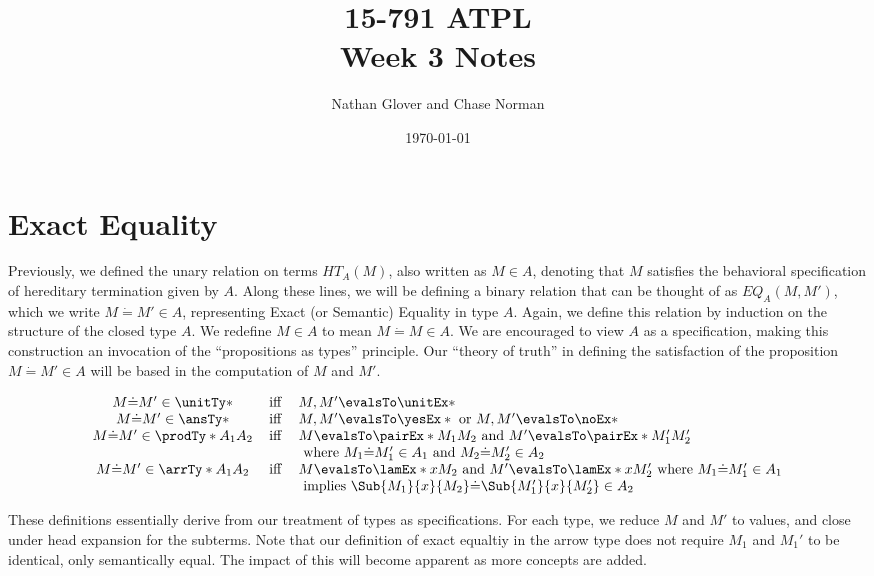 \documentclass[letterpaper]{article}
\title{15-791 ATPL \\ Week 3 Notes}
\author{Nathan Glover and Chase Norman}
\date{\today}
\begin{document}
\maketitle

\section{Exact Equality}

Previously, we defined the unary relation on terms $HT_A(M)$, also written as $M \in A$, denoting that $M$ satisfies the behavioral specification of hereditary termination given by $A$.
Along these lines, we will be defining a binary relation that can be thought of as $EQ_A(M, M')$, which we write $M \dot{=} M' \in A$, representing Exact (or Semantic) Equality in type $A$.
Again, we define this relation by induction on the structure of the closed type $A$. We redefine $M \in A$ to mean $M \dot{=} M \in A$. 
We are encouraged to view $A$ as a specification, making this construction an invocation of the ``propositions as types'' principle. 
Our ``theory of truth'' in defining the satisfaction of the proposition $M \dot{=} M' \in A$ will be based in the computation of $M$ and $M'$. 

\begin{definition}
    $$
  \begin{array}{cll}
      M \dot{=} M' \in \unitTy* & \Iff & M, M' \evalsTo \unitEx* \\
      M \dot{=} M' \in \ansTy* & \Iff & M, M' \evalsTo \yesEx* \text{ or } M, M' \evalsTo \noEx* \\
      M \dot{=} M' \in \prodTy*{A_1}{A_2} & \Iff &
         M \evalsTo \pairEx*{M_1}{M_2} \text{ and } M' \evalsTo \pairEx*{M_1'}{M_2'}\\ & & \text{ where } M_1 \dot{=} M_1' \in A_1 \text{ and } M_2 \dot{=} M_2' \in A_2 \\
      M \dot{=} M' \in \arrTy*{A_1}{A_2} & \Iff & M \evalsTo \lamEx*{x}{M_2} \text{ and } M' \evalsTo \lamEx*{x}{M_2'} \text{ where } M_1 \dot{=} M_1' \in A_1 \\ & & 
         \text{ implies } \Sub{M_1}{x}{M_2} \dot{=} \Sub{M_1'}{x}{M_2'} \in A_2 \\
  \end{array}
  $$
\end{definition}

These definitions essentially derive from our treatment of types as specifications. For each type, we reduce $M$ and $M'$ to values, and close under head expansion for the subterms. 
Note that our definition of exact equaltiy in the arrow type does not require $M_1$ and $M_1'$ to be identical, only semantically equal. 
The impact of this will become apparent as more concepts are added.
\end{document}
